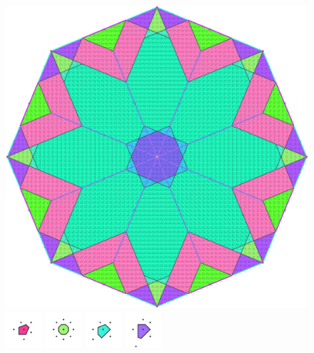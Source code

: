 \documentclass[text.tex]{subfiles}
\begin{document}
\pagestyle{fancy}
\fancyhf{}
\begin{figure}[h!]
\centering
\includegraphics[width=1\textwidth]{img/results/octagon/octagon_100000_(1_0alpha_1).pdf}
\includegraphics[width=0.12\textwidth]{img/results/octagon/octagon_100000_(1_0alpha_1)_001.pdf}
\includegraphics[width=0.12\textwidth]{img/results/octagon/octagon_100000_(1_0alpha_1)_002.pdf}
\includegraphics[width=0.12\textwidth]{img/results/octagon/octagon_100000_(1_0alpha_1)_003.pdf}
\includegraphics[width=0.12\textwidth]{img/results/octagon/octagon_100000_(1_0alpha_1)_004.pdf}

\end{figure}
\end{document}
